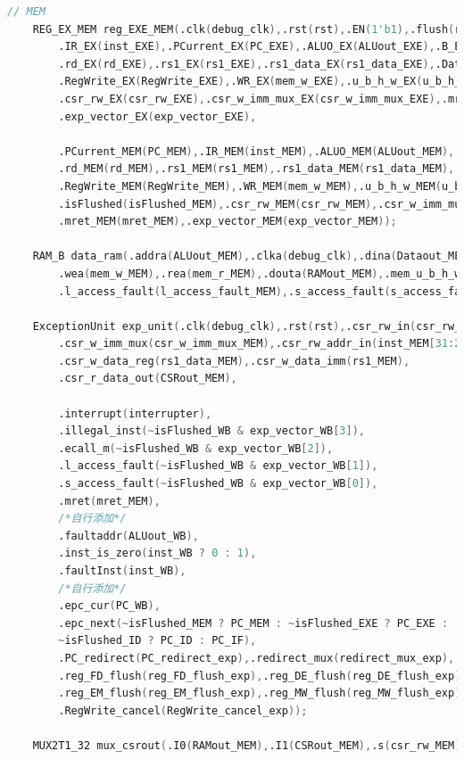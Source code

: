\begin{lstlisting}[language = {verilog}]
    // MEM
    REG_EX_MEM reg_EXE_MEM(.clk(debug_clk),.rst(rst),.EN(1'b1),.flush(reg_EM_flush_exp | isFlushed_EXE),
        .IR_EX(inst_EXE),.PCurrent_EX(PC_EXE),.ALUO_EX(ALUout_EXE),.B_EX(Dataout_EXE),
        .rd_EX(rd_EXE),.rs1_EX(rs1_EXE),.rs1_data_EX(rs1_data_EXE),.DatatoReg_EX(DatatoReg_EXE),
        .RegWrite_EX(RegWrite_EXE),.WR_EX(mem_w_EXE),.u_b_h_w_EX(u_b_h_w_EXE),.mem_r_EX(mem_r_EXE),
        .csr_rw_EX(csr_rw_EXE),.csr_w_imm_mux_EX(csr_w_imm_mux_EXE),.mret_EX(mret_EXE),
        .exp_vector_EX(exp_vector_EXE),

        .PCurrent_MEM(PC_MEM),.IR_MEM(inst_MEM),.ALUO_MEM(ALUout_MEM),.Datao_MEM(Dataout_MEM),
        .rd_MEM(rd_MEM),.rs1_MEM(rs1_MEM),.rs1_data_MEM(rs1_data_MEM),.DatatoReg_MEM(DatatoReg_MEM),
        .RegWrite_MEM(RegWrite_MEM),.WR_MEM(mem_w_MEM),.u_b_h_w_MEM(u_b_h_w_MEM),.mem_r_MEM(mem_r_MEM),
        .isFlushed(isFlushed_MEM),.csr_rw_MEM(csr_rw_MEM),.csr_w_imm_mux_MEM(csr_w_imm_mux_MEM),
        .mret_MEM(mret_MEM),.exp_vector_MEM(exp_vector_MEM));
    
    RAM_B data_ram(.addra(ALUout_MEM),.clka(debug_clk),.dina(Dataout_MEM), 
        .wea(mem_w_MEM),.rea(mem_r_MEM),.douta(RAMout_MEM),.mem_u_b_h_w(u_b_h_w_MEM),
        .l_access_fault(l_access_fault_MEM),.s_access_fault(s_access_fault_MEM));

    ExceptionUnit exp_unit(.clk(debug_clk),.rst(rst),.csr_rw_in(csr_rw_MEM),.csr_wsc_mode_in(inst_MEM[13:12]),
        .csr_w_imm_mux(csr_w_imm_mux_MEM),.csr_rw_addr_in(inst_MEM[31:20]),
        .csr_w_data_reg(rs1_data_MEM),.csr_w_data_imm(rs1_MEM),
        .csr_r_data_out(CSRout_MEM),

        .interrupt(interrupter),
        .illegal_inst(~isFlushed_WB & exp_vector_WB[3]),
        .ecall_m(~isFlushed_WB & exp_vector_WB[2]),
        .l_access_fault(~isFlushed_WB & exp_vector_WB[1]),
        .s_access_fault(~isFlushed_WB & exp_vector_WB[0]),
        .mret(mret_MEM),
        /*自行添加*/
        .faultaddr(ALUout_WB),
        .inst_is_zero(inst_WB ? 0 : 1),
        .faultInst(inst_WB),
        /*自行添加*/    
        .epc_cur(PC_WB),
        .epc_next(~isFlushed_MEM ? PC_MEM : ~isFlushed_EXE ? PC_EXE :
        ~isFlushed_ID ? PC_ID : PC_IF),
        .PC_redirect(PC_redirect_exp),.redirect_mux(redirect_mux_exp),
        .reg_FD_flush(reg_FD_flush_exp),.reg_DE_flush(reg_DE_flush_exp),
        .reg_EM_flush(reg_EM_flush_exp),.reg_MW_flush(reg_MW_flush_exp),
        .RegWrite_cancel(RegWrite_cancel_exp));
    
    MUX2T1_32 mux_csrout(.I0(RAMout_MEM),.I1(CSRout_MEM),.s(csr_rw_MEM),.o(Datain_MEM));
        


\end{lstlisting}
